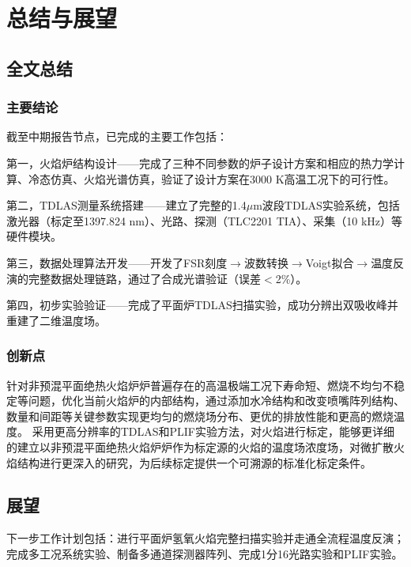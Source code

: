 
\chapter{总结与展望}


\section{全文总结}

\subsection{主要结论}

截至中期报告节点，已完成的主要工作包括：

第一，火焰炉结构设计——完成了三种不同参数的炉子设计方案和相应的热力学计算、冷态仿真、火焰光谱仿真，验证了设计方案在3000 K高温工况下的可行性。

第二，TDLAS测量系统搭建——建立了完整的1.4$\mu$m波段TDLAS实验系统，包括激光器（标定至1397.824 nm）、光路、探测（TLC2201 TIA）、采集（10 kHz）等硬件模块。

第三，数据处理算法开发——开发了FSR刻度$\to$波数转换$\to$Voigt拟合$\to$温度反演的完整数据处理链路，通过了合成光谱验证（误差$<$2\%）。

第四，初步实验验证——完成了平面炉TDLAS扫描实验，成功分辨出双吸收峰并重建了二维温度场。

\subsection{创新点}

针对非预混平面绝热火焰炉炉普遍存在的高温极端工况下寿命短、燃烧不均匀不稳定等问题，优化当前火焰炉的内部结构，通过添加水冷结构和改变喷嘴阵列结构、数量和间距等关键参数实现更均匀的燃烧场分布、更优的排放性能和更高的燃烧温度。
采用更高分辨率的TDLAS和PLIF实验方法，对火焰进行标定，能够更详细的建立以非预混平面绝热火焰炉炉作为标定源的火焰的温度场浓度场，对微扩散火焰结构进行更深入的研究，为后续标定提供一个可溯源的标准化标定条件。


\section{展望}

下一步工作计划包括：进行平面炉氢氧火焰完整扫描实验并走通全流程温度反演；完成多工况系统实验、制备多通道探测器阵列、完成1分16光路实验和PLIF实验。